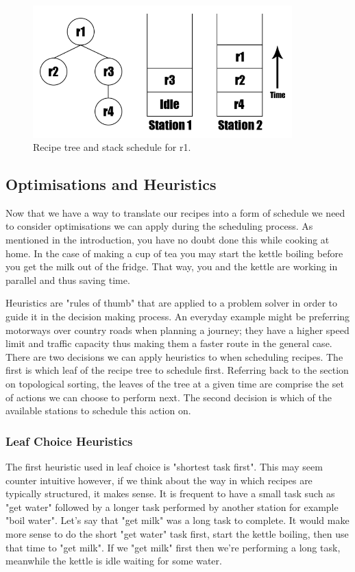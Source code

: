 \documentclass[11pt]{article}
\begin{document}
\begin{figure}[h]
\includegraphics[width=10cm, keepaspectratio]{stacks.png}
\centering
\caption{Recipe tree and stack schedule for r1.}
\end{figure}

\subsection{Optimisations and Heuristics}

Now that we have a way to translate our recipes into a form of schedule we need to consider
optimisations we can apply during the scheduling process. As mentioned in the introduction,
you have no doubt done this while cooking at home. In the case of making a cup of tea you
may start the kettle boiling before you get the milk out of the fridge. That way, you and
the kettle are working in parallel and thus saving time.

\medbreak

Heuristics are "rules of thumb" that are applied to a problem solver in order to guide it
in the decision making process. An everyday example might be preferring motorways over country roads
when planning a journey; they have a higher speed limit and traffic capacity thus making
them a faster route in the general case. There are two decisions we can apply heuristics to
when scheduling recipes. The first is which leaf of the recipe tree to schedule first.
Referring back to the section on topological sorting, the leaves of the tree at a given time
are comprise the set of actions we can choose to perform next. The second decision is which
of the available stations to schedule this action on.

\subsubsection{Leaf Choice Heuristics}

The first heuristic used in leaf choice is "shortest task first". This may seem counter intuitive however,
if we think about the way in which recipes are typically structured, it makes sense. It is frequent
to have a small task such as "get water" followed by a longer task performed by another station
for example "boil water". Let's say that "get milk" was a long task to complete. It would make more
sense to do the short "get water" task first, start the kettle boiling, then use that time to
"get milk". If we "get milk" first then we're performing a long task, meanwhile the kettle is idle
waiting for some water.
\end{document}
